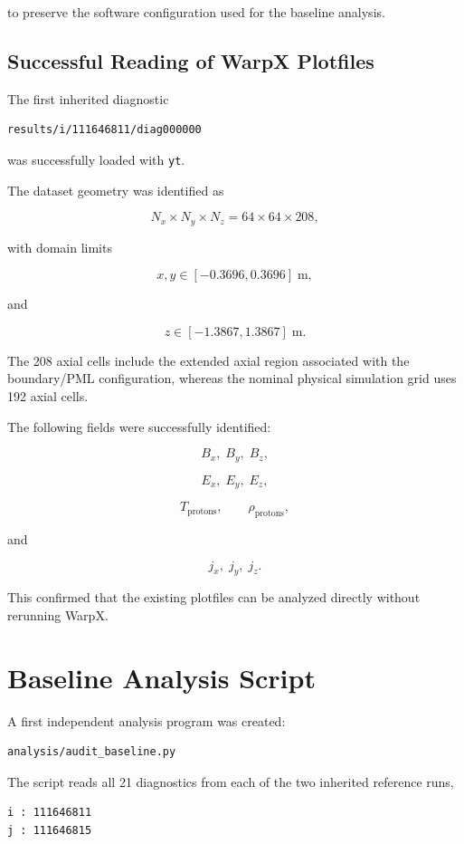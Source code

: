 \documentclass[11pt,a4paper]{article}
\begin{document}
to preserve the software configuration used for the baseline analysis.

\subsection{Successful Reading of WarpX Plotfiles}

The first inherited diagnostic

\begin{lstlisting}
results/i/111646811/diag000000
\end{lstlisting}

was successfully loaded with \texttt{yt}.

The dataset geometry was identified as

\[
N_x\times N_y\times N_z
=
64\times64\times208,
\]

with domain limits

\[
x,y\in[-0.3696,0.3696]\;\mathrm{m},
\]

and

\[
z\in[-1.3867,1.3867]\;\mathrm{m}.
\]

The 208 axial cells include the extended axial region associated with the
boundary/PML configuration, whereas the nominal physical simulation grid uses
192 axial cells.

The following fields were successfully identified:

\[
B_x,\;B_y,\;B_z,
\]

\[
E_x,\;E_y,\;E_z,
\]

\[
T_{\mathrm{protons}},
\qquad
\rho_{\mathrm{protons}},
\]

and

\[
j_x,\;j_y,\;j_z.
\]

This confirmed that the existing plotfiles can be analyzed directly without
rerunning WarpX.

\section{Baseline Analysis Script}

A first independent analysis program was created:

\begin{lstlisting}
analysis/audit_baseline.py
\end{lstlisting}

The script reads all 21 diagnostics from each of the two inherited reference
runs,

\begin{lstlisting}
i : 111646811
j : 111646815
\end{lstlisting}
\end{document}
